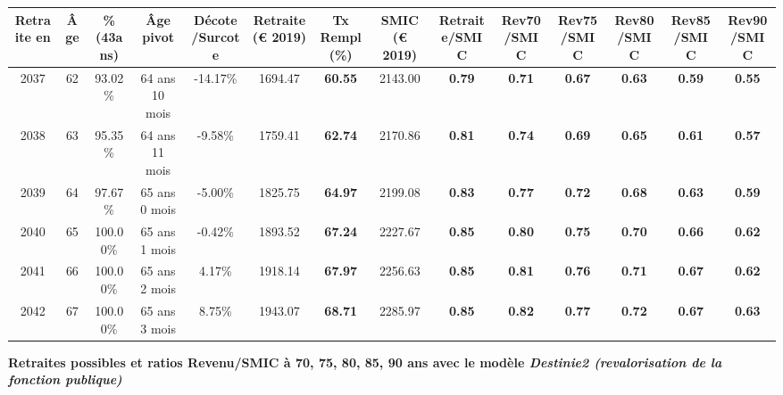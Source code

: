 \begin{adjustbox}{max width=\textwidth} 
\begin{tabular}[htb]{|c|c||c|c|c||c|c||c||c|c|c|c|c|c|} 
\hline 
 Retraite en &  Âge &  \%(43ans) &  Âge pivot &  Décote/Surcote &  Retraite (\euro{} 2019) &  Tx Rempl(\%) &  SMIC (\euro{} 2019) &  Retraite/SMIC &  Rev70/SMIC &  Rev75/SMIC &  Rev80/SMIC &  Rev85/SMIC &  Rev90/SMIC \\ 
\hline \hline 
 2037 &  62 &  93.02\% &  64 ans 10 mois &  -14.17\% &  1694.47 &  {\bf 60.55} &  2143.00 &  {\bf {\color{red} 0.79}} &  {\bf {\color{red} 0.71}} &  {\bf {\color{red} 0.67}} &  {\bf {\color{red} 0.63}} &  {\bf {\color{red} 0.59}} &  {\bf {\color{red} 0.55}} \\ 
\hline 
 2038 &  63 &  95.35\% &  64 ans 11 mois &  -9.58\% &  1759.41 &  {\bf 62.74} &  2170.86 &  {\bf {\color{red} 0.81}} &  {\bf {\color{red} 0.74}} &  {\bf {\color{red} 0.69}} &  {\bf {\color{red} 0.65}} &  {\bf {\color{red} 0.61}} &  {\bf {\color{red} 0.57}} \\ 
\hline 
 2039 &  64 &  97.67\% &  65 ans 0 mois &  -5.00\% &  1825.75 &  {\bf 64.97} &  2199.08 &  {\bf {\color{red} 0.83}} &  {\bf {\color{red} 0.77}} &  {\bf {\color{red} 0.72}} &  {\bf {\color{red} 0.68}} &  {\bf {\color{red} 0.63}} &  {\bf {\color{red} 0.59}} \\ 
\hline 
 2040 &  65 &  100.00\% &  65 ans 1 mois &  -0.42\% &  1893.52 &  {\bf 67.24} &  2227.67 &  {\bf {\color{red} 0.85}} &  {\bf {\color{red} 0.80}} &  {\bf {\color{red} 0.75}} &  {\bf {\color{red} 0.70}} &  {\bf {\color{red} 0.66}} &  {\bf {\color{red} 0.62}} \\ 
\hline 
 2041 &  66 &  100.00\% &  65 ans 2 mois &  4.17\% &  1918.14 &  {\bf 67.97} &  2256.63 &  {\bf {\color{red} 0.85}} &  {\bf {\color{red} 0.81}} &  {\bf {\color{red} 0.76}} &  {\bf {\color{red} 0.71}} &  {\bf {\color{red} 0.67}} &  {\bf {\color{red} 0.62}} \\ 
\hline 
 2042 &  67 &  100.00\% &  65 ans 3 mois &  8.75\% &  1943.07 &  {\bf 68.71} &  2285.97 &  {\bf {\color{red} 0.85}} &  {\bf {\color{red} 0.82}} &  {\bf {\color{red} 0.77}} &  {\bf {\color{red} 0.72}} &  {\bf {\color{red} 0.67}} &  {\bf {\color{red} 0.63}} \\ 
\hline 
\hline 
\end{tabular} 
\end{adjustbox} 
 
 \vspace{0.1cm} 
{\bf \noindent Retraites possibles et ratios Revenu/SMIC à 70, 75, 80, 85, 90 ans avec le modèle \emph{Destinie2 (revalorisation de la fonction publique)}}  
 
